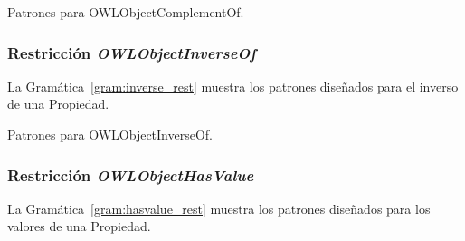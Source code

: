 \begin{GrammarEnv}
\begin{grammar}
\end{grammar}
\caption{Patrones para OWLObjectComplementOf.}\label{gram:complement_rest}
\end{GrammarEnv}

\subsubsection{Restricción \emph{OWLObjectInverseOf}}
La Gramática~\ref{gram:inverse_rest} muestra los patrones diseñados para el inverso de una Propiedad.

\begin{GrammarEnv}
\begin{grammar}
\end{grammar}
\caption{Patrones para OWLObjectInverseOf.}\label{gram:inverse_rest}
\end{GrammarEnv}

\subsubsection{Restricción \emph{OWLObjectHasValue}}
La Gramática~\ref{gram:hasvalue_rest} muestra los patrones diseñados para los valores de una Propiedad.

